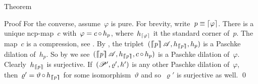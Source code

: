 \documentclass[b]{subfiles}
\begin{document}
\begin{parsec}
\begin{point}{Theorem}
\begin{point}{Proof}
For the converse, assume~$\varphi$ is pure.
For brevity, write~$p \equiv \left\lceil\varphi\right\rceil$.
There is a unique ncp-map~$c$ with~$\varphi = c \mathop{\circ} h_p$,
    where~$h_{\left\lceil\varphi\right\rceil}$ it the standard corner of~$p$.
The map~$c$ is a compression,
    see .
By ,
    the triplet~$(\cceil{p}\scrA, h_{\cceil{p}}, h_p)$
    is a Paschke dilation of~$h_p$.
So by 
    we see~$(\cceil{p}\scrA, h_{\cceil{p}}, c\after h_p)$
    is a Paschke dilation of~$ \varphi$.
Clearly~$h_{\left\lceil\!\!\left\lceil p\right\rceil\!\!\right\rceil}$ is surjective.
If~$(\mathscr{P}', \varrho', h')$ is any other Paschke dilation of~$\varphi$,
    then~$\varrho' = \vartheta \mathop{\circ} h_{\left\lceil\!\!\left\lceil p\right\rceil\!\!\right\rceil}$
    for some isomorphism~$\vartheta$
    and so~$\varrho'$ is surjective as well. \qed
\end{point}
\end{point}
\end{parsec}
\end{document}
